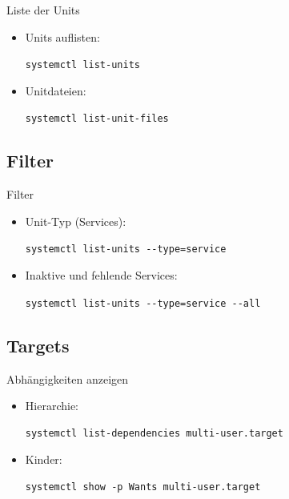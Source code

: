 \begin{frame}[fragile]{Liste der Units}
  \begin{itemize}
    \item
Units auflisten:

    \verb|systemctl list-units|
    \item
Unitdateien:

\verb|systemctl list-unit-files|
  \end{itemize}
\end{frame}

\subsection{Filter}

\begin{frame}[fragile]{Filter}
  \begin{itemize}
    \item
	    Unit-Typ (Services):

    \verb|systemctl list-units --type=service|

\item
	Inaktive und fehlende Services:

    \verb|systemctl list-units --type=service --all|
  \end{itemize}
\end{frame}

%


\subsection{Targets}

\begin{frame}[fragile]{Abhängigkeiten anzeigen}
\begin{itemize}
	\item		Hierarchie:	
\begin{lstlisting}
systemctl list-dependencies multi-user.target
\end{lstlisting}
\item	Kinder:

\begin{lstlisting}
systemctl show -p Wants multi-user.target
\end{lstlisting}
\end{itemize}
\end{frame}

